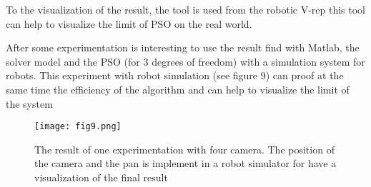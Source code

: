 To the visualization of the result, the tool is used from the robotic V-rep \cite{verp} this tool can help to visualize the limit of PSO on the real world.

After some experimentation is interesting to use the result find with Matlab, the solver model and the PSO (for 3 degrees of freedom) with a simulation system for robots. This experiment with robot simulation (see figure 9) can proof at the same time the efficiency of the algorithm and can help to visualize the limit of the system

\begin{figure}
  \centering
  \hspace*{\fill}
	{\texttt{[image: fig9.png]}}
  \hspace*{\fill}
  \caption{%
	The result of one experimentation with four camera. The position of the camera and the pan is implement in a robot simulator for have a visualization of the final result}
  \label{fig:4}
\end{figure} 

